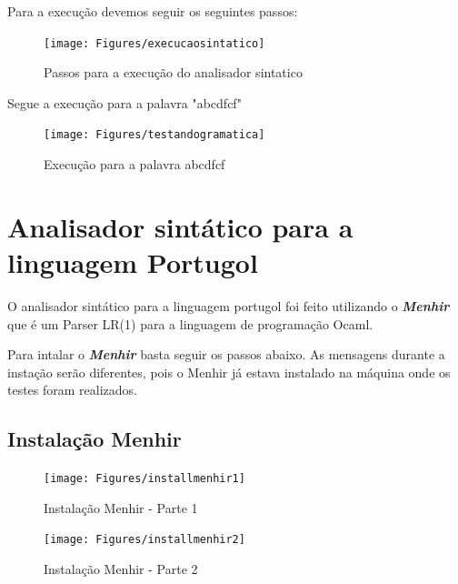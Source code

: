 \documentclass[hidelinks,12pt]{article}
\begin{document}
	Para a execução devemos seguir os seguintes passos:
		
	\begin{figure}[h!]
		\centering
		\texttt{[image: Figures/execucaosintatico]}
		\caption{Passos para a execução do analisador sintatico}
	\end{figure}
	
	Segue a execução para a palavra "abcdfcf"
	
	\begin{figure}[h!]
		\centering
		\texttt{[image: Figures/testandogramatica]}
		\caption{Execução para a palavra abcdfcf}
	\end{figure}
	
	
	\newpage
	\section{Analisador sintático para a linguagem Portugol}
	
	O analisador sintático para a linguagem portugol foi feito utilizando o \textbf{\textit{Menhir}}
	que é um Parser LR(1) para a linguagem de programação Ocaml.
	
	Para intalar o \textbf{\textit{Menhir}} basta seguir os passos abaixo. As mensagens durante a instação serão diferentes, pois o Menhir já estava instalado na máquina onde os testes foram realizados.	

	\subsection{Instalação Menhir}	
	\begin{figure}[h!]
		\centering
		\texttt{[image: Figures/installmenhir1]}
		\caption{Instalação Menhir - Parte 1}
	\end{figure}
	
	\begin{figure}[h!]
		\centering
		\texttt{[image: Figures/installmenhir2]}
		\caption{Instalação Menhir - Parte 2}
	\end{figure}
	
	
	\newpage
\end{document}
